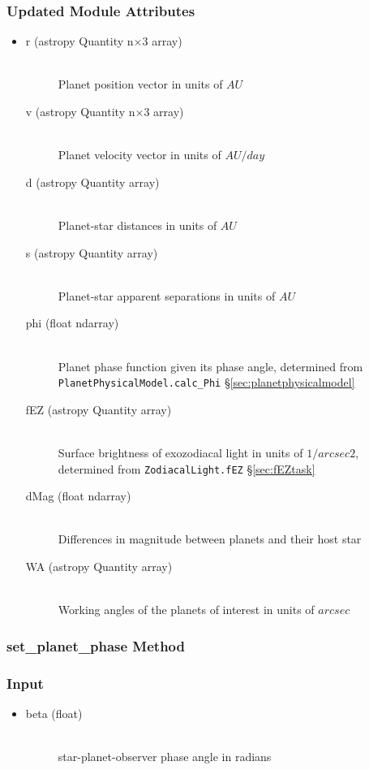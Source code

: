 \documentclass[cleanfoot]{asme2ej}
\begin{document}
\subsubsection*{Updated Module Attributes}
\begin{itemize}
\item 
\begin{description}
    \item[r (astropy Quantity n$\times$3 array)] \hfill \\ Planet position vector in units of $ AU $
    \item[v (astropy Quantity n$\times$3 array)] \hfill \\ Planet velocity vector in units of $ AU/day $
    \item[d (astropy Quantity array)] \hfill \\ Planet-star distances in units of $ AU $
    \item[s (astropy Quantity array)] \hfill \\ Planet-star apparent separations in units of $ AU $
    \item[phi (float ndarray)] \hfill \\ Planet phase function given its phase angle, determined from \verb+PlanetPhysicalModel.calc_Phi+ \S\ref{sec:planetphysicalmodel}
    \item[fEZ (astropy Quantity array)] \hfill \\ Surface brightness of exozodiacal light in units of $ 1/arcsec2 $, determined from \verb+ZodiacalLight.fEZ+ \S\ref{sec:fEZtask}
    \item[dMag (float ndarray)] \hfill \\ Differences in magnitude between planets and their host star
    \item[WA (astropy Quantity array)] \hfill \\ Working angles of the planets of interest in units of $arcsec$
\end{description}
\end{itemize}

\subsubsection{set\_planet\_phase Method} \label{sec:setplanetphasetask}
\subsubsection*{Input}
\begin{itemize}
\item
\begin{description}
    \item[beta (float)] \hfill \\ star-planet-observer phase angle in radians
\end{description}
\end{itemize}
\end{document}
